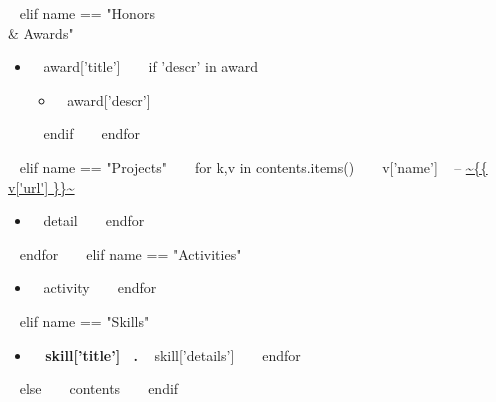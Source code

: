   \begin{minipage}{\textwidth}
  \printbibliography[heading=none,type=article]
  \bigskip

~{ elif name == "Honors \\& Awards" }~
  \begin{itemize}
    ~{ for award in contents }~
      \item ~{{ award['title'] }}~
      ~{ if 'descr' in award }~
        \begin{itemize}
          \item ~{{ award['descr'] }}~
        \end{itemize}
      ~{ endif }~
    ~{ endfor }~
  \end{itemize}
  \bigskip
~{ elif name == "Projects" }~
  ~{ for k,v in contents.items() }~
    {\large ~{{ v['name'] }}~ -- \url{ ~{{ v['url'] }}~ } }
    \begin{itemize}
      ~{ for detail in v['details'] }~
        \item ~{{ detail }}~
      ~{ endfor }~
    \end{itemize}
    \bigskip
  ~{ endfor }~
~{ elif name == "Activities" }~
  \begin{itemize}
    ~{ for activity in contents }~
      \item ~{{ activity }}~
    ~{ endfor }~
  \end{itemize}
  \bigskip
~{ elif name == "Skills" }~
  \begin{itemize}
    ~{ for skill in contents }~
      \item { \bf ~{{ skill['title'] }}~. } ~{{ skill['details'] }}~
    ~{ endfor }~
  \end{itemize}
  \bigskip
~{ else }~
  ~{{ contents }}~
  \bigskip
~{ endif }~
\end{minipage}
